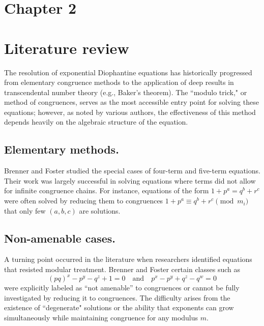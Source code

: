 \documentclass[12pt]{article}
\begin{document}
\newpage
\begin{center}
    \section*{Chapter 2}
    \section*{Literature review}
\end{center}


\hspace*{0.5cm}The resolution of exponential Diophantine equations has historically progressed from elementary congruence methods to the application of deep results in transcendental number theory (e.g., Baker's theorem). The ``modulo trick," or method of congruences, serves as the most accessible entry point for solving these equations; however, as noted by various authors, the effectiveness of this method depends heavily on the algebraic structure of the equation.

\subsection*{Elementary methods. }
\hspace*{0.5cm}Brenner and Foster \cite{eDe} studied the special cases of four-term and five-term equations. Their work was largely successful in solving equations where terms did not allow for infinite congruence chains. For instance, equations of the form $1+p^a = q^b + r^c$ were often solved by reducing them to congruences $1+p^a \equiv q^b + r^c \pmod {m_i} $ that only few $(a,b,c)$ are solutions.

\subsection*{Non-amenable cases. }
\hspace*{0.5cm} A turning point occurred in the literature when researchers identified equations that resisted modular treatment. Brenner and Foster \cite{eDe} certain classes such as 
$$(pq)^x - p^y - q^z + 1 = 0 \quad \text{and} \quad p^x - p^y + q^z - q^w = 0$$
were explicitly labeled as ``not amenable'' to congruences or cannot be fully investigated by reducing it to congruences. The difficulty arises from the existence of ``degenerate" solutions or the ability that exponents can grow simultaneously while maintaining congruence for any modulus $m$. 
\end{document}
